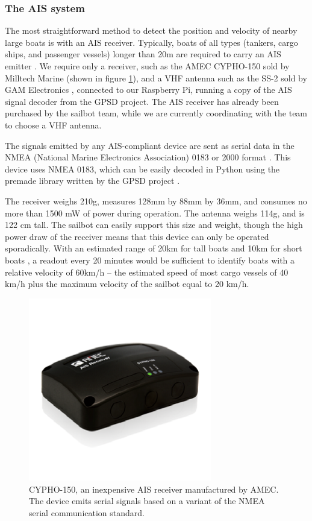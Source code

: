 \subsubsection{\label{sec:method:proposed-design:ais}The AIS system}
The most straightforward method to detect the position and velocity of nearby large boats is with an AIS receiver. Typically, boats of all types (tankers, cargo ships, and passenger vessels) longer than 20m are required to carry an AIS emitter \cite{us-ais-requirements}. We require only a receiver, such as the AMEC CYPHO-150 sold by Milltech Marine (shown in figure \ref{fig:ais__amec-cypho-150}), and a VHF antenna such as the SS-2 sold by GAM Electronics \cite{gam-electronics__ss-2}, connected to our Raspberry Pi, running a copy of the AIS signal decoder from the GPSD project. The AIS receiver has already been purchased by the sailbot team, while we are currently coordinating with the team to choose a VHF antenna.

The signals emitted by any AIS-compliant device are sent as serial data in the NMEA (National Marine Electronics Association) 0183 or 2000 format \cite{nmea__standards}. This device uses NMEA 0183, which can be easily decoded in Python using the premade library written by the GPSD project \cite{gpsd__overview}.

The receiver weighs 210g, measures 128mm by 88mm by 36mm, and consumes no more than 1500 mW of power during operation. The antenna weighs 114g, and is 122 cm tall. The sailbot can easily support this size and weight, though the high power draw of the receiver means that this device can only be operated sporadically. With an estimated range of 20km for tall boats and 10km for short boats \cite{mca-uk__mgn324}, a readout every 20 minutes would be sufficient to identify boats with a relative velocity of 60km/h -- the estimated speed of most cargo vessels of 40 km/h plus the maximum velocity of the sailbot equal to 20 km/h.

\begin{figure}
\centering
\includegraphics[width=80mm,natwidth=300,natheight=300]{"./image/ais__amec-cypho-150"}
\caption[AMEC CYPHO-150 AIS receiver.]{\label{fig:ais__amec-cypho-150}CYPHO-150, an inexpensive AIS receiver manufactured by AMEC. The device emits serial signals based on a variant of the NMEA serial communication standard. \cite{milltech__amec-cypho150}}
\end{figure}

